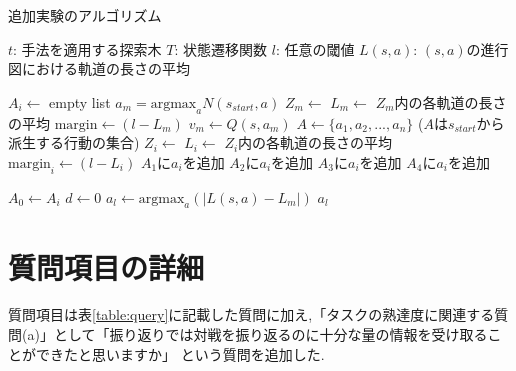 \begin{algorithm}
    \small
    \caption{追加実験のアルゴリズム}
    \label{alg:myalg-add}
    \begin{algorithmic}[1]
        \State $t$: 手法を適用する探索木
        \State $T$: 状態遷移関数
        \State $l$: 任意の閾値
        \State $L(s, a)$: $(s, a)$の進行図における軌道の長さの平均

        
        
       
               $A_i \gets $ empty list
           \EndFor
           \State $a_m = \textrm{argmax}_a N(s_{start}, a)$
           \State $Z_m \gets$ 
           \State $L_m \gets $ $Z_m$内の各軌道の長さの平均
           \State $\textrm{margin} \gets (l-L_m)$
           \State $v_m \gets Q(s, a_m)$
           \State $A \gets \{a_1, a_2, ..., a_n\}$ ($A$は$s_{start}$から派生する行動の集合)
            \State $Z_i \gets$ 
            \State $L_i \gets $ $Z_i$内の各軌道の長さの平均
            \State $\textrm{margin}_i \gets (l-L_i)$
                    \State $A_1$に$a_i$を追加
                \Else
                    \State $A_2$に$a_i$を追加
                \EndIf
            \Else
                    \State $A_3$に$a_i$を追加
                \Else
                    \State $A_4$に$a_i$を追加
                \EndIf

            \EndIf
           \EndFor

                   $A_0 \gets A_i$
                \EndIf
           \EndFor
           \State $d \gets 0$
           \State $a_l \gets \textrm{argmax}_a (|L(s,a)-L_m|)$
           \State \Return $a_l$
        \EndFunction
    \end{algorithmic}
\end{algorithm}












\section{質問項目の詳細}
質問項目は表\ref{table:query}に記載した質問に加え,「タスクの熟達度に関連する質問(a)」として「振り返りでは対戦を振り返るのに十分な量の情報を受け取ることができたと思いますか」
という質問を追加した.
